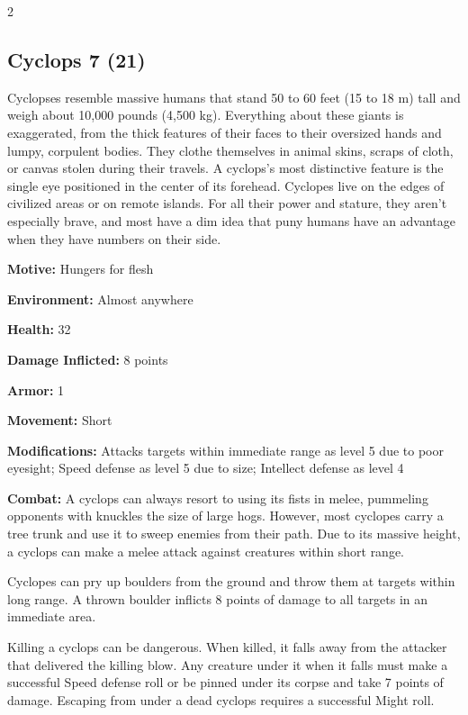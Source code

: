 \begin{multicols}{2}
\subsection{Cyclops 7 (21)}


Cyclopses resemble massive humans that stand 50 to 60 feet (15 to 18 m) tall and weigh about 10,000 pounds (4,500 kg). Everything about these giants is exaggerated, from the thick features of their faces to their oversized hands and lumpy, corpulent bodies. They clothe themselves in animal skins, scraps of cloth, or canvas stolen during their travels. A cyclops’s most distinctive feature is the single eye positioned in the center of its forehead. Cyclopes live on the edges of civilized areas or on remote islands. For all their power and stature, they aren’t especially brave, and most have a dim idea that puny humans have an advantage when they have numbers on their side.

\textbf{Motive:} Hungers for flesh 

\textbf{Environment:} Almost anywhere 

\textbf{Health:} 32

\textbf{Damage Inflicted:} 8 points 

\textbf{Armor:} 1 

\textbf{Movement:} Short 

\textbf{Modifications:} Attacks targets within immediate range as level 5 due to poor eyesight; Speed defense as level 5 due to size; Intellect defense as level 4 

\textbf{Combat:} A cyclops can always resort to using its fists in melee, pummeling opponents with knuckles the size of large hogs. However, most cyclopes carry a tree trunk and use it to sweep enemies from their path. Due to its massive height, a cyclops can make a melee attack against creatures within short range. 

Cyclopes can pry up boulders from the ground and throw them at targets within long range. A thrown boulder inflicts 8 points of damage to all targets in an immediate area. 

Killing a cyclops can be dangerous. When killed, it falls away from the attacker that delivered the killing blow. Any creature under it when it falls must make a successful Speed defense roll or be pinned under its corpse and take 7 points of damage. Escaping from under a dead cyclops requires a successful Might roll. 


\end{multicols}
